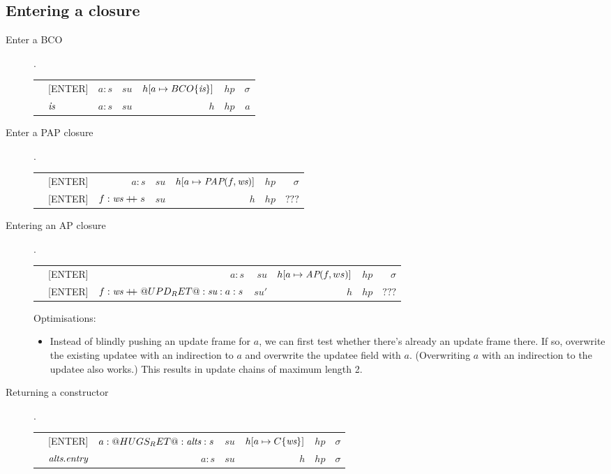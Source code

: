 \documentclass[11pt]{article}
\newcommand{\Subsection}[2]{\subsection{#1}\label{sec:#2}}
\begin{document}
\Subsection{Entering a closure}{hugs-entering}

\begin{description}

\item[ Enter a BCO ].

\begin{tabular}{|llrrrrr|}
\hline
	& [ENTER]	& $a : s$ 	& $su$ & $h[a \mapsto BCO\{\mbox{\it is}\} ]$  	& $hp$ & $\sigma$ \\
\next	& $\mbox{\it is}$ 	& $a : s$ 	& $su$ & $h$ 				& $hp$ & $a$ \\
\hline
\end{tabular}

\item[ Enter a PAP closure ].

\begin{tabular}{|llrrrrr|}
\hline
	& [ENTER]	& $a : s$ 		& $su$ & $h[a \mapsto \mbox{\it PAP}(f,\mbox{\it ws})]$  	& $hp$ & $\sigma$ \\
\next	& [ENTER] 	& $f : \mbox{\it ws} \mathrel{+\mkern-6mu+} s$ 	& $su$ & $h$ 				& $hp$ & $???$ \\
\hline
\end{tabular}

\item[ Entering an AP closure ].

\begin{tabular}{|llrrrrr|}
\hline
	& [ENTER]	& $a : s$ 				& $su$ 	& $h[a \mapsto \mbox{\it AP}(f,ws)]$  	& $hp$ & $\sigma$ \\
\next	& [ENTER] 	& $f : \mbox{\it ws} \mathrel{+\mkern-6mu+} @UPD_RET@:\mbox{\it su}:a:s$ 	& $su'$	& $h$ 				& $hp$ & $???$ \\
\hline
\end{tabular}

Optimisations:
\begin{itemize}
\item Instead of blindly pushing an update frame for $a$, we can first test whether there's already
 an update frame there.  If so, overwrite the existing updatee with an indirection to $a$ and
 overwrite the updatee field with $a$.  (Overwriting $a$ with an indirection to the updatee also
 works.)  This results in update chains of maximum length 2. 
\end{itemize}


\item[ Returning a constructor ].

\begin{tabular}{|llrrrrr|}
\hline
	& [ENTER]		& $a : @HUGS_RET@ : \mbox{\it alts} : s$ 	& $su$ & $h[a \mapsto C\{\mbox{\it ws}\}]$  	& $hp$ & $\sigma$ \\
\next	& $\mbox{\it alts}.\mbox{\it entry}$	& $a:s$ 			& $su$ & $h$ 				& $hp$ & $\sigma$ \\
\hline
\end{tabular}



\end{description}
\end{document}
